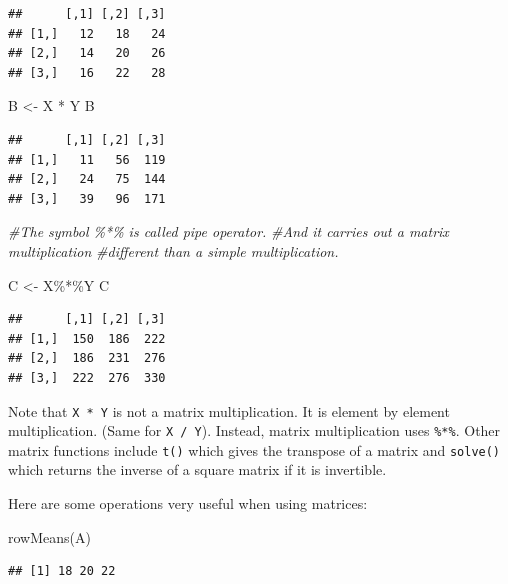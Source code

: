 \documentclass[
]{book}
\newenvironment{Shaded}{\begin{snugshade}}{\end{snugshade}}
\newcommand{\CommentTok}[1]{\textcolor[rgb]{0.56,0.35,0.01}{\textit{#1}}}
\newcommand{\FunctionTok}[1]{\textcolor[rgb]{0.00,0.00,0.00}{#1}}
\newcommand{\NormalTok}[1]{#1}
\newcommand{\OtherTok}[1]{\textcolor[rgb]{0.56,0.35,0.01}{#1}}
\newcommand{\SpecialCharTok}[1]{\textcolor[rgb]{0.00,0.00,0.00}{#1}}
\begin{document}
\begin{verbatim}
##      [,1] [,2] [,3]
## [1,]   12   18   24
## [2,]   14   20   26
## [3,]   16   22   28
\end{verbatim}

\begin{Shaded}
\begin{Highlighting}[]
\NormalTok{B }\OtherTok{\textless{}{-}}\NormalTok{ X }\SpecialCharTok{*}\NormalTok{ Y}
\NormalTok{B}
\end{Highlighting}
\end{Shaded}

\begin{verbatim}
##      [,1] [,2] [,3]
## [1,]   11   56  119
## [2,]   24   75  144
## [3,]   39   96  171
\end{verbatim}

\begin{Shaded}
\begin{Highlighting}[]
\CommentTok{\#The symbol \%*\% is called pipe operator.}
\CommentTok{\#And it carries out a matrix multiplication}
\CommentTok{\#different than a simple multiplication.}

\NormalTok{C }\OtherTok{\textless{}{-}}\NormalTok{ X}\SpecialCharTok{\%*\%}\NormalTok{Y  }
\NormalTok{C}
\end{Highlighting}
\end{Shaded}

\begin{verbatim}
##      [,1] [,2] [,3]
## [1,]  150  186  222
## [2,]  186  231  276
## [3,]  222  276  330
\end{verbatim}

Note that \texttt{X\ *\ Y} is not a matrix multiplication. It is element by element multiplication. (Same for \texttt{X\ /\ Y}). Instead, matrix multiplication uses \texttt{\%*\%}. Other matrix functions include \texttt{t()} which gives the transpose of a matrix and \texttt{solve()} which returns the inverse of a square matrix if it is invertible.

Here are some operations very useful when using matrices:

\begin{Shaded}
\begin{Highlighting}[]
\FunctionTok{rowMeans}\NormalTok{(A)}
\end{Highlighting}
\end{Shaded}

\begin{verbatim}
## [1] 18 20 22
\end{verbatim}
\end{document}
